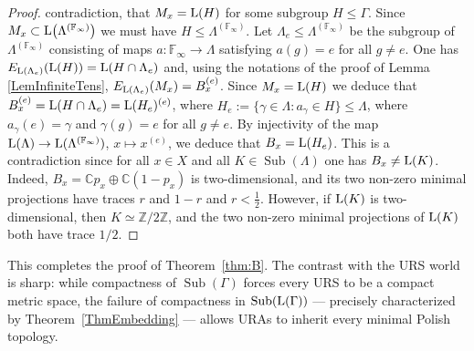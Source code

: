\documentclass[12pt]{amsart} %
\theoremstyle{plain}
\theoremstyle{definition}
\DeclareMathOperator{\Sub}{Sub}
\begin{document}
\begin{proof}
contradiction, that $M_x={\rm L}(H)$ for some subgroup \(H\leq\Gamma\). Since $M_x\subset{\rm L}\bigl(\Lambda^{(\mathbb F_\infty)}\bigr)$ we must have $H\leq \Lambda^{(\mathbb F_\infty)}$.
Let $\Lambda_e\leq \Lambda^{(\mathbb F_\infty)}$ be the subgroup of $\Lambda^{(\mathbb{F}_\infty)}$ consisting of maps $a:\mathbb{F}_\infty\to\Lambda$ satisfying $a(g)=e$ for all $g\neq e$. One has $E_{{\rm L}(\Lambda_e)}({\rm L}(H))={\rm L}(H\cap \Lambda_e)$ and, using the notations of the proof of Lemma \ref{LemInfiniteTens}, $E_{{\rm L}(\Lambda_e)}(M_x)=B_x^{(e)}$. Since $M_x={\rm L}(H)$ we deduce that $B_x^{(e)}={\rm L}(H\cap \Lambda_e)={\rm L}(H_e)^{(e)}$, where $H_e:=\{\gamma\in\Lambda:a_\gamma\in H\}\leq\Lambda$, where $a_\gamma(e)=\gamma$ and $\gamma(g)=e$ for all $g\neq e$. By injectivity of the map ${\rm L}(\Lambda)\to{\rm L}(\Lambda^{(\mathbb{F}_\infty)})$, $x\mapsto x^{(e)}$, we deduce that $B_x={\rm L}(H_e)$. This is a contradiction since for all $x\in X$ and all $K\in\Sub(\Lambda)$ one has \(B_x\neq{\rm L}(K)\). Indeed, $B_x=\mathbb C p_x\oplus \mathbb C(1-p_x)$ is two-dimensional, and its two non-zero minimal projections have traces $r$ and $1-r$ and $r<\frac12$. However, if ${\rm L}(K)$ is two-dimensional, then \(K\simeq\mathbb Z/2\mathbb Z\), and the
two non-zero minimal projections of \({\rm L}(K)\) both have trace \(1/2\).
\end{proof}
This completes the proof of Theorem~\ref{thm:B}. The contrast with the URS world is sharp: while compactness of $\Sub(\Gamma)$ forces every URS to be a compact metric space, the failure of compactness in $\Sub({\rm L}(\Gamma))$ --- precisely characterized by Theorem~\ref{ThmEmbedding} --- allows URAs to inherit every minimal Polish topology. %
\end{document}
